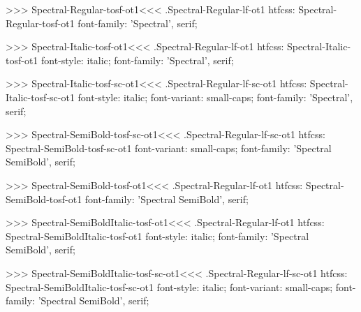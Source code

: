>>>
\<Spectral-Regular-tosf-ot1\><<<
.Spectral-Regular-lf-ot1
htfcss:  Spectral-Regular-tosf-ot1  font-family: 'Spectral', serif;

>>>
\<Spectral-Italic-tosf-ot1\><<<
.Spectral-Regular-lf-ot1
htfcss:  Spectral-Italic-tosf-ot1  font-style: italic; font-family: 'Spectral', serif;

>>>
\<Spectral-Italic-tosf-sc-ot1\><<<
.Spectral-Regular-lf-sc-ot1
htfcss:  Spectral-Italic-tosf-sc-ot1  font-style: italic; font-variant: small-caps; font-family: 'Spectral', serif;

>>>
\<Spectral-SemiBold-tosf-sc-ot1\><<<
.Spectral-Regular-lf-sc-ot1
htfcss:  Spectral-SemiBold-tosf-sc-ot1  font-variant: small-caps; font-family: 'Spectral SemiBold', serif;

>>>
\<Spectral-SemiBold-tosf-ot1\><<<
.Spectral-Regular-lf-ot1
htfcss:  Spectral-SemiBold-tosf-ot1  font-family: 'Spectral SemiBold', serif;

>>>
\<Spectral-SemiBoldItalic-tosf-ot1\><<<
.Spectral-Regular-lf-ot1
htfcss:  Spectral-SemiBoldItalic-tosf-ot1  font-style: italic; font-family: 'Spectral SemiBold', serif;

>>>
\<Spectral-SemiBoldItalic-tosf-sc-ot1\><<<
.Spectral-Regular-lf-sc-ot1
htfcss:  Spectral-SemiBoldItalic-tosf-sc-ot1  font-style: italic; font-variant: small-caps; font-family: 'Spectral SemiBold', serif;

